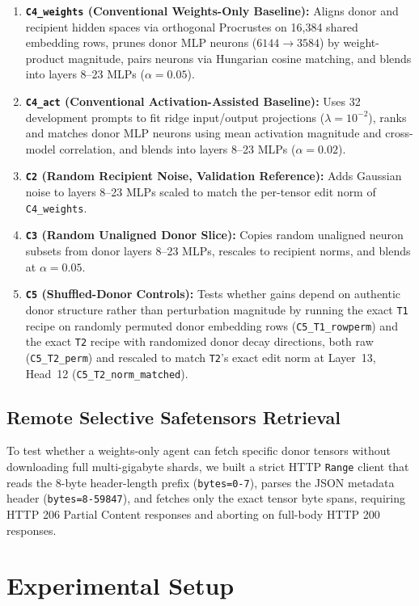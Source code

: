 \documentclass[11pt]{article}
\begin{document}
\begin{enumerate}
\item \textbf{\texttt{C4\_weights} (Conventional Weights-Only Baseline):} Aligns donor and recipient hidden spaces via orthogonal Procrustes on 16,384 shared embedding rows, prunes donor MLP neurons ($6144 \rightarrow 3584$) by weight-product magnitude, pairs neurons via Hungarian cosine matching, and blends into layers 8--23 MLPs ($\alpha = 0.05$).
\item \textbf{\texttt{C4\_act} (Conventional Activation-Assisted Baseline):} Uses 32 development prompts to fit ridge input/output projections ($\lambda = 10^{-2}$), ranks and matches donor MLP neurons using mean activation magnitude and cross-model correlation, and blends into layers 8--23 MLPs ($\alpha = 0.02$).
\item \textbf{\texttt{C2} (Random Recipient Noise, Validation Reference):} Adds Gaussian noise to layers 8--23 MLPs scaled to match the per-tensor edit norm of \texttt{C4\_weights}.
\item \textbf{\texttt{C3} (Random Unaligned Donor Slice):} Copies random unaligned neuron subsets from donor layers 8--23 MLPs, rescales to recipient norms, and blends at $\alpha = 0.05$.
\item \textbf{\texttt{C5} (Shuffled-Donor Controls):} Tests whether gains depend on authentic donor structure rather than perturbation magnitude by running the exact \texttt{T1} recipe on randomly permuted donor embedding rows (\texttt{C5\_T1\_rowperm}) and the exact \texttt{T2} recipe with randomized donor decay directions, both raw (\texttt{C5\_T2\_perm}) and rescaled to match \texttt{T2}'s exact edit norm at Layer~13, Head~12 (\texttt{C5\_T2\_norm\_matched}).
\end{enumerate}

\subsection{Remote Selective Safetensors Retrieval}

To test whether a weights-only agent can fetch specific donor tensors without downloading full multi-gigabyte shards, we built a strict HTTP \texttt{Range} client that reads the 8-byte header-length prefix (\texttt{bytes=0-7}), parses the JSON metadata header (\texttt{bytes=8-59847}), and fetches only the exact tensor byte spans, requiring HTTP 206 Partial Content responses and aborting on full-body HTTP 200 responses.

\section{Experimental Setup}
\end{document}
